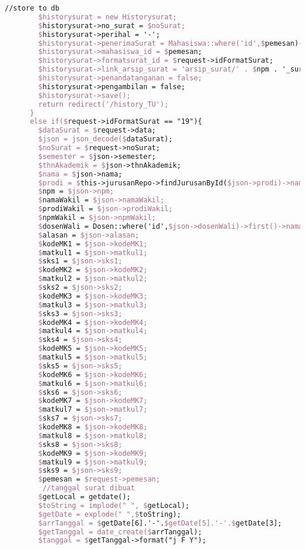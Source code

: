 \begin{lstlisting}[language=tex,basicstyle=\tiny,caption=HistorysuratController.php]
        //store to db
        $historysurat = new Historysurat;
        $historysurat->no_surat = $noSurat;
        $historysurat->perihal = '-';
        $historysurat->penerimaSurat = Mahasiswa::where('id',$pemesan)->first()->dosen->nama_dosen;
        $historysurat->mahasiswa_id = $pemesan;
        $historysurat->formatsurat_id = $request->idFormatSurat;
        $historysurat->link_arsip_surat = 'arsip_surat/' . $npm . '_surat_perwakilan_perwalian_8mk.pdf';
        $historysurat->penandatanganan = false;
        $historysurat->pengambilan = false;
        $historysurat->save();
        return redirect('/history_TU');
      }
      else if($request->idFormatSurat == "19"){
        $dataSurat = $request->data;
        $json = json_decode($dataSurat);
        $noSurat = $request->noSurat;
        $semester = $json->semester;
        $thnAkademik = $json->thnAkademik;
        $nama = $json->nama;
        $prodi = $this->jurusanRepo->findJurusanById($json->prodi)->nama_jurusan;
        $npm = $json->npm;
        $namaWakil = $json->namaWakil;
        $prodiWakil = $json->prodiWakil;
        $npmWakil = $json->npmWakil;
        $dosenWali = Dosen::where('id',$json->dosenWali)->first()->nama_dosen;
        $alasan = $json->alasan;
        $kodeMK1 = $json->kodeMK1;
        $matkul1 = $json->matkul1;
        $sks1 = $json->sks1;
        $kodeMK2 = $json->kodeMK2;
        $matkul2 = $json->matkul2;
        $sks2 = $json->sks2;
        $kodeMK3 = $json->kodeMK3;
        $matkul3 = $json->matkul3;
        $sks3 = $json->sks3;
        $kodeMK4 = $json->kodeMK4;
        $matkul4 = $json->matkul4;
        $sks4 = $json->sks4;
        $kodeMK5 = $json->kodeMK5;
        $matkul5 = $json->matkul5;
        $sks5 = $json->sks5;
        $kodeMK6 = $json->kodeMK6;
        $matkul6 = $json->matkul6;
        $sks6 = $json->sks6;
        $kodeMK7 = $json->kodeMK7;
        $matkul7 = $json->matkul7;
        $sks7 = $json->sks7;
        $kodeMK8 = $json->kodeMK8;
        $matkul8 = $json->matkul8;
        $sks8 = $json->sks8;
        $kodeMK9 = $json->kodeMK9;
        $matkul9 = $json->matkul9;
        $sks9 = $json->sks9;
        $pemesan = $request->pemesan;
         //tanggal surat dibuat
        $getLocal = getdate();
        $toString = implode(" ", $getLocal);
        $getDate = explode(" ",$toString);
        $arrTanggal = $getDate[6].'-'.$getDate[5].'-'.$getDate[3];
        $getTanggal = date_create($arrTanggal);
        $tanggal = $getTanggal->format("j F Y");


\end{lstlisting}
